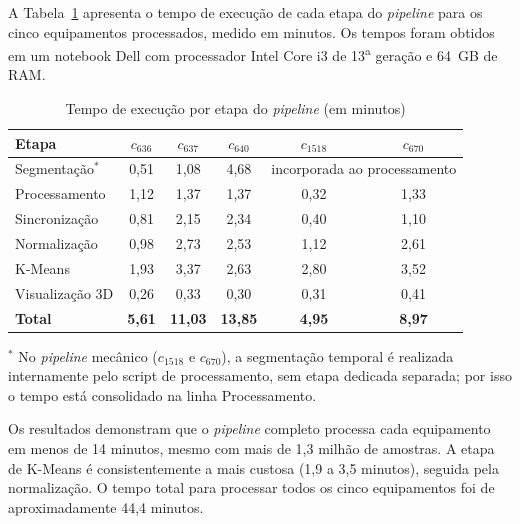 A Tabela~\ref{tab:tempos_execucao} apresenta o tempo de execução de cada etapa do \textit{pipeline} para os cinco equipamentos processados, medido em minutos. Os tempos foram obtidos em um notebook Dell com processador Intel Core i3 de 13\textsuperscript{a} geração e 64~GB de RAM.

\begin{table}[H]
    \centering
    \caption{Tempo de execução por etapa do \textit{pipeline} (em minutos)}
    \label{tab:tempos_execucao}
    \begin{tabular}{|l|c|c|c|c|c|}
        \hline
        \textbf{Etapa}  & \textbf{$c_{636}$} & \textbf{$c_{637}$} & \textbf{$c_{640}$} & \textbf{$c_{1518}$} & \textbf{$c_{670}$} \\
        \hline
        Segmentação$^{*}$ & 0,51             & 1,08               & 4,68               & \multicolumn{2}{c|}{incorporada ao processamento} \\
        Processamento     & 1,12             & 1,37               & 1,37               & 0,32                & 1,33               \\
        Sincronização     & 0,81             & 2,15               & 2,34               & 0,40                & 1,10               \\
        Normalização      & 0,98             & 2,73               & 2,53               & 1,12                & 2,61               \\
        K-Means           & 1,93             & 3,37               & 2,63               & 2,80                & 3,52               \\
        Visualização 3D   & 0,26             & 0,33               & 0,30               & 0,31                & 0,41               \\
        \hline
        \textbf{Total}    & \textbf{5,61}    & \textbf{11,03}     & \textbf{13,85}     & \textbf{4,95}       & \textbf{8,97}      \\
        \hline
    \end{tabular}

    \smallskip
    \footnotesize{$^{*}$ No \textit{pipeline} mecânico ($c_{1518}$ e $c_{670}$), a segmentação temporal é realizada internamente pelo script de processamento, sem etapa dedicada separada; por isso o tempo está consolidado na linha Processamento.}
\end{table}

Os resultados demonstram que o \textit{pipeline} completo processa cada equipamento em menos de 14 minutos, mesmo com mais de 1,3 milhão de amostras. A etapa de K-Means é consistentemente a mais custosa (1,9 a 3,5 minutos), seguida pela normalização. O tempo total para processar todos os cinco equipamentos foi de aproximadamente 44,4 minutos.

